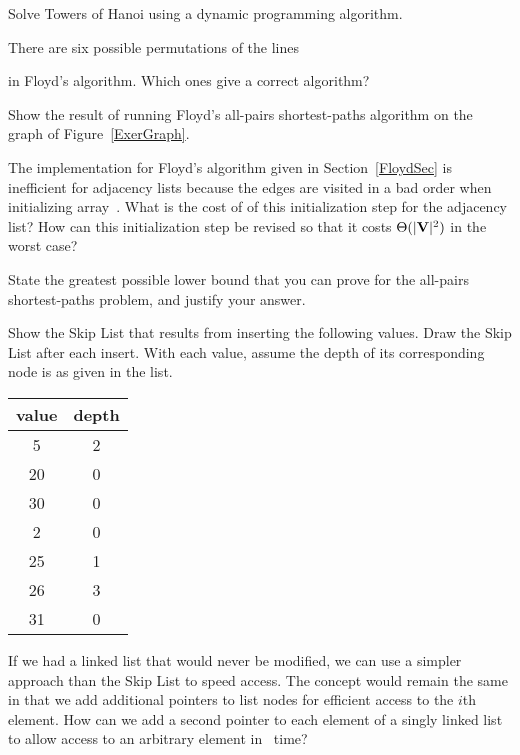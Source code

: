 \begin{exercises}

\item
Solve Towers of Hanoi using a dynamic programming
algorithm.

\item
There are six possible permutations of the lines


in Floyd's algorithm.
Which ones give a correct algorithm?

\item
Show the result of running
Floyd's
all-pairs shortest-paths algorithm on
the graph of Figure~\ref{ExerGraph}.

\item
The implementation for
Floyd's algorithm given in
Section~\ref{FloydSec} is inefficient for adjacency lists because the
edges are visited in a bad order when initializing array~.
What is the cost of of this initialization step for the adjacency
list?
How can this initialization step be revised so that it costs
$\Theta(|{\textbf{V}}|^2)$ in the worst case?

\item
State the greatest possible lower bound that you can prove for the
all-pairs shortest-paths problem, and justify your
answer.

\item
Show the Skip List that results from inserting the following values.
Draw the Skip List after each insert.
With each value, assume the depth of its corresponding node is as
given in the list.

\begin{center}
\sffamily
\begin{tabular}{cc}
\textbf{value}&\textbf{depth}\\
\hline
5&2\\
20&0\\
30&0\\
2&0\\
25&1\\
26&3\\
31&0\\
\end{tabular}
\end{center}

\item
If we had a linked list that would never be modified, we can use a
simpler approach than the Skip List
to speed access.
The concept would remain the same in that we  add additional pointers
to list nodes for efficient access to the $i$th element.
How can we add a second pointer to each element of a singly linked
list to allow access to an arbitrary element in \Ologn\ time?


\end{exercises}
